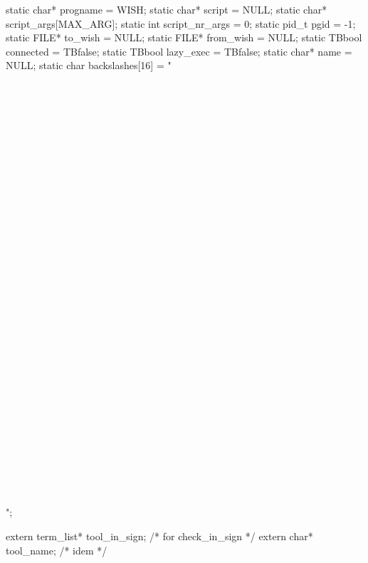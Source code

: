 \nwenddocs{}\endmoddef\nwstartdeflinemarkup{}\nwenddeflinemarkup
static char*  progname             = WISH;
static char*  script               = NULL;
static char*  script_args[MAX_ARG];
static int    script_nr_args       = 0;
static pid_t  pgid                 = -1;
static FILE*  to_wish              = NULL;
static FILE*  from_wish            = NULL;
static TBbool connected            = TBfalse;
static TBbool lazy_exec            = TBfalse;
static char*  name                 = NULL;
static char   backslashes[16]      = "\\\\\\\\\\\\\\\\\\\\\\\\\\\\\\\\\\\\\\\\\\\\\\\\\\\\\\\\\\\\\\\\";

extern term_list* tool_in_sign; /* for check_in_sign */
extern char*      tool_name;    /* idem */
\nwendcode{}\nwdocspar


